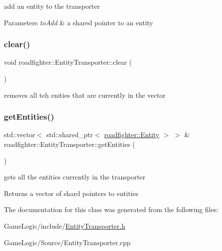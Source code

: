 add an entity to the transporter 
\begin{DoxyParams}{Parameters}
{\em to\+Add} & a shared pointer to an entity \\
\hline
\end{DoxyParams}
\mbox{\label{classroadfighter_1_1EntityTransporter_ac0e443566db9213272103952eb697d92}} 
\subsubsection{\texorpdfstring{clear()}{clear()}}
{\footnotesize\ttfamily void roadfighter\+::\+Entity\+Transporter\+::clear (\begin{DoxyParamCaption}{ }\end{DoxyParamCaption})}

removes all teh enities that are currently in the vector \mbox{\label{classroadfighter_1_1EntityTransporter_ac19204b4b7104561957b3a741fd6ceb5}} 
\subsubsection{\texorpdfstring{get\+Entities()}{getEntities()}}
{\footnotesize\ttfamily std\+::vector$<$ std\+::shared\+\_\+ptr$<$ \hyperlink{classroadfighter_1_1Entity}{roadfighter\+::\+Entity} $>$ $>$ \& roadfighter\+::\+Entity\+Transporter\+::get\+Entities (\begin{DoxyParamCaption}{ }\end{DoxyParamCaption})}

gets all the entities currently in the transporter \begin{DoxyReturn}{Returns}
a vector of shard pointers to entities 
\end{DoxyReturn}


The documentation for this class was generated from the following files\+:\begin{DoxyCompactItemize}
\item 
Game\+Logic/include/\hyperlink{EntityTransporter_8h}{Entity\+Transporter.\+h}\item 
Game\+Logic/\+Source/Entity\+Transporter.\+cpp\end{DoxyCompactItemize}
